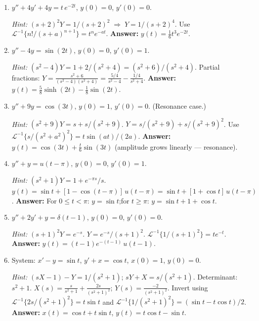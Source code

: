 \documentclass[12pt,a4paper]{article}
\begin{document}
\begin{enumerate}

\item $y'' + 4y' + 4y = t\,e^{-2t}$, $y(0) = 0$, $y'(0) = 0$.

\textit{Hint:} $(s+2)^2 Y = 1/(s+2)^2 \;\Rightarrow\; Y = 1/(s+2)^4$.
Use $\mathcal{L}^{-1}\{n!/(s+a)^{n+1}\} = t^n e^{-at}$.
\textbf{Answer:} $y(t) = \tfrac{1}{6}t^3 e^{-2t}$.

\item $y'' - 4y = \sin(2t)$, $y(0) = 0$, $y'(0) = 1$.

\textit{Hint:} $(s^2-4)Y = 1 + 2/(s^2+4) = (s^2+6)/(s^2+4)$.
Partial fractions: $Y = \frac{s^2+6}{(s^2-4)(s^2+4)} = \frac{5/4}{s^2-4} - \frac{1/4}{s^2+4}$.
\textbf{Answer:} $y(t) = \tfrac{5}{8}\sinh(2t) - \tfrac{1}{8}\sin(2t)$.

\item $y'' + 9y = \cos(3t)$, $y(0) = 1$, $y'(0) = 0$. (Resonance case.)

\textit{Hint:} $(s^2+9)Y = s + s/(s^2+9)$.
$Y = s/(s^2+9) + s/(s^2+9)^2$.
Use $\mathcal{L}^{-1}\{s/(s^2+a^2)^2\} = t\sin(at)/(2a)$.
\textbf{Answer:} $y(t) = \cos(3t) + \tfrac{t}{6}\sin(3t)$ (amplitude grows linearly --- resonance).

\item $y'' + y = u(t-\pi)$, $y(0) = 0$, $y'(0) = 1$.

\textit{Hint:} $(s^2+1)Y = 1 + e^{-\pi s}/s$.
$y(t) = \sin t + [1-\cos(t-\pi)]\,u(t-\pi) = \sin t + [1+\cos t]\,u(t-\pi)$.
\textbf{Answer:} For $0\leq t < \pi$: $y=\sin t$;\quad for $t\geq\pi$: $y=\sin t + 1 + \cos t$.

\item $y'' + 2y' + y = \delta(t-1)$, $y(0) = 0$, $y'(0) = 0$.

\textit{Hint:} $(s+1)^2 Y = e^{-s}$.
$Y = e^{-s}/(s+1)^2$.
$\mathcal{L}^{-1}\{1/(s+1)^2\} = te^{-t}$.
\textbf{Answer:} $y(t) = (t-1)e^{-(t-1)}\,u(t-1)$.

\item System: $x' - y = \sin t$, $y' + x = \cos t$, $x(0)=1$, $y(0)=0$.

\textit{Hint:} $(sX-1) - Y = 1/(s^2+1)$; $sY + X = s/(s^2+1)$.
Determinant: $s^2+1$.
$X(s) = \frac{s}{s^2+1} + \frac{2s}{(s^2+1)^2}$; $Y(s) = \frac{-2}{(s^2+1)^2}$.
Invert using $\mathcal{L}^{-1}\{2s/(s^2+1)^2\} = t\sin t$ and $\mathcal{L}^{-1}\{1/(s^2+1)^2\} = (\sin t - t\cos t)/2$.
\textbf{Answer:} $x(t) = \cos t + t\sin t$, \quad $y(t) = t\cos t - \sin t$.

\end{enumerate}
\end{document}
